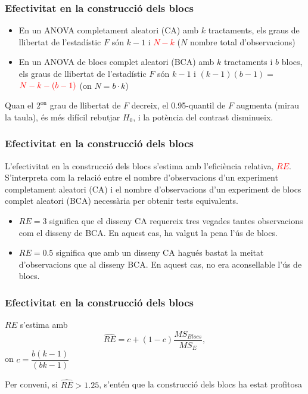 \documentclass[12pt,t]{beamer}
\newcommand{\red}[1]{\textcolor{red}{#1}}
\renewcommand{\emph}[1]{{\color{red}#1}}
\theoremstyle{plain}
\theoremstyle{definition}
\begin{document}
\begin{frame}
\frametitle{Efectivitat en la construcció dels blocs}
\begin{itemize}
\item En un ANOVA completament aleatori (CA) amb $k$ tractaments, els graus de llibertat de l'estadístic $F$ són $k-1$ i \red{$N-k$} ($N$ nombre total d'observacions)
\medskip

\item En un ANOVA de blocs complet  aleatori (BCA) amb $k$ tractaments i $b$ blocs, els graus de llibertat de l'estadístic $F$ són $k-1$ i $(k-1)(b-1)=$ $\red{N-k-(b-1)}$ (on $N=b\cdot k$)
\end{itemize}

Quan el $2^{\mathrm{on}}$ grau de llibertat de $F$ decreix, el 0.95-quantil de $F$ augmenta (mirau la taula), és més difícil rebutjar $H_0$, i la potència del contrast disminueix.
\medskip


\end{frame}


\begin{frame}
\frametitle{Efectivitat en la construcció dels blocs}

L'efectivitat en la construcció dels blocs  s'estima amb l'\emph{eficiència relativa}, \red{$RE$}. S'interpreta com 
la relació entre el nombre d'observacions d'un experiment completament aleatori (CA) i el nombre d'observacions 
d'un experiment de blocs complet  aleatori (BCA) necessària per obtenir tests equivalents.
\medskip

\begin{itemize}
\item $RE=3$ significa que el disseny CA
requereix tres vegades tantes observacions com el disseny de BCA. En aquest
cas, ha valgut la pena l'ús de blocs. 

\item $RE=0.5$ significa que amb un disseny CA hagués bastat la meitat d'observacions que  al disseny 
BCA. En aquest
cas, no era aconsellable l'ús de blocs. 
\end{itemize}

\end{frame}

\begin{frame}
\frametitle{Efectivitat en la construcció dels blocs}

$RE$ s'estima amb
$$
\widehat{RE}=c+(1-c)\frac{MS_{Blocs}}{MS_E},
$$
on $c=\dfrac{b(k-1)}{(bk-1)}$
\bigskip

Per conveni, si  $\widehat{RE}>1.25$, s'entén que la
construcció dels blocs ha estat profitosa
\end{frame}
\end{document}
